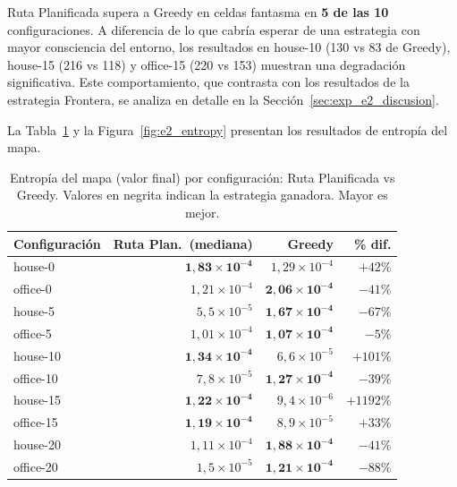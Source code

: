 Ruta Planificada supera a Greedy en celdas fantasma en \textbf{5 de las 10} configuraciones. A diferencia de lo que cabría esperar de una estrategia con mayor consciencia del entorno, los resultados en house-10 (130 vs 83 de Greedy), house-15 (216 vs 118) y office-15 (220 vs 153) muestran una degradación significativa. Este comportamiento, que contrasta con los resultados de la estrategia Frontera, se analiza en detalle en la Sección~\ref{sec:exp_e2_discusion}.

La Tabla~\ref{tab:e2_entropy} y la Figura~\ref{fig:e2_entropy} presentan los resultados de entropía del mapa.

\begin{table}[htbp]
    \centering
    \caption{Entropía del mapa (valor final) por configuración: Ruta Planificada vs Greedy. Valores en negrita indican la estrategia ganadora. Mayor es mejor.}%
    \label{tab:e2_entropy}
    \begin{tabular}{lrrr}
        \toprule
        \textbf{Configuración} & \textbf{Ruta Plan.\ (mediana)} & \textbf{Greedy} & \textbf{\% dif.} \\
        \midrule
        house-0   & $\mathbf{1{,}83 \times 10^{-4}}$ & $1{,}29 \times 10^{-4}$ & $+42\%$    \\
        office-0  & $1{,}21 \times 10^{-4}$ & $\mathbf{2{,}06 \times 10^{-4}}$ & $-41\%$   \\
        house-5   & $5{,}5 \times 10^{-5}$  & $\mathbf{1{,}67 \times 10^{-4}}$ & $-67\%$   \\
        office-5  & $1{,}01 \times 10^{-4}$ & $\mathbf{1{,}07 \times 10^{-4}}$ & $-5\%$    \\
        house-10  & $\mathbf{1{,}34 \times 10^{-4}}$ & $6{,}6 \times 10^{-5}$  & $+101\%$  \\
        office-10 & $7{,}8 \times 10^{-5}$  & $\mathbf{1{,}27 \times 10^{-4}}$ & $-39\%$   \\
        house-15  & $\mathbf{1{,}22 \times 10^{-4}}$ & $9{,}4 \times 10^{-6}$  & $+1192\%$ \\
        office-15 & $\mathbf{1{,}19 \times 10^{-4}}$ & $8{,}9 \times 10^{-5}$  & $+33\%$   \\
        house-20  & $1{,}11 \times 10^{-4}$ & $\mathbf{1{,}88 \times 10^{-4}}$ & $-41\%$   \\
        office-20 & $1{,}5 \times 10^{-5}$  & $\mathbf{1{,}21 \times 10^{-4}}$ & $-88\%$   \\
        \bottomrule
    \end{tabular}
\end{table}

